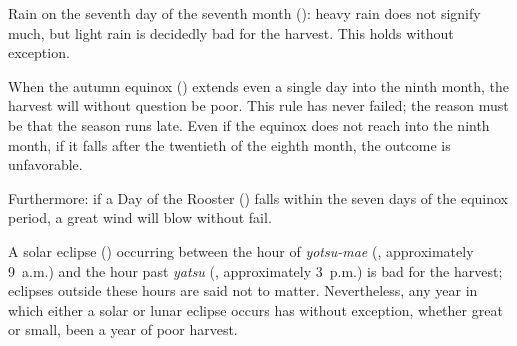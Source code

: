 
\begin{sokyubox}
{\small\itshape\color{sokyubar} }

\medskip
Rain on the seventh day of the seventh month ():
heavy rain does not signify much, but light rain is decidedly bad
for the harvest. This holds without exception.
\end{sokyubox}


\begin{sokyubox}
{\small\itshape\color{sokyubar} }

\medskip
When the autumn equinox () extends even a
single day into the ninth month, the harvest will without question
be poor. This rule has never failed; the reason must be that the
season runs late. Even if the equinox does not reach into the ninth
month, if it falls after the twentieth of the eighth month, the
outcome is unfavorable.

Furthermore: if a Day of the Rooster () falls
within the seven days of the equinox period, a great wind will
blow without fail.
\end{sokyubox}


\begin{sokyubox}
{\small\itshape\color{sokyubar} }

\medskip
A solar eclipse () occurring between the hour of
\textit{yotsu-mae} (, approximately 9~a.m.) and the hour past
\textit{yatsu} (, approximately 3~p.m.) is bad for the harvest;
eclipses outside these hours are said not to matter. Nevertheless,
any year in which either a solar or lunar eclipse occurs has without
exception, whether great or small, been a year of poor harvest.
\end{sokyubox}

